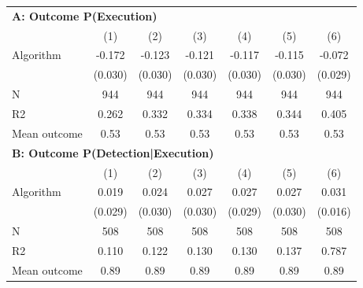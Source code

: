 \begin{tabular}{lcccccc} \toprule
\multicolumn{7}{l}{\textbf{A: Outcome P(Execution)}} \\ \multicolumn{1}{l}{} & (1) & (2) & (3) & (4) & (5) & (6) \\ \midrule
Algorithm   &      -0.172\sym{***}&      -0.123\sym{***}&      -0.121\sym{***}&      -0.117\sym{***}&      -0.115\sym{***}&      -0.072\sym{**} \\
            &     (0.030)         &     (0.030)         &     (0.030)         &     (0.030)         &     (0.030)         &     (0.029)         \\
\midrule
N           &         944         &         944         &         944         &         944         &         944         &         944         \\
R2          &       0.262         &       0.332         &       0.334         &       0.338         &       0.344         &       0.405         \\
Mean outcome&        0.53         &        0.53         &        0.53         &        0.53         &        0.53         &        0.53         \\

\midrule \multicolumn{7}{l}{\textbf{B: Outcome P(Detection|Execution)}} \\ \multicolumn{1}{l}{} & (1) & (2) & (3) & (4) & (5) & (6) \\ \midrule
Algorithm   &       0.019         &       0.024         &       0.027         &       0.027         &       0.027         &       0.031\sym{*}  \\
            &     (0.029)         &     (0.030)         &     (0.030)         &     (0.029)         &     (0.030)         &     (0.016)         \\
\midrule
N           &         508         &         508         &         508         &         508         &         508         &         508         \\
R2          &       0.110         &       0.122         &       0.130         &       0.130         &       0.137         &       0.787         \\
Mean outcome&        0.89         &        0.89         &        0.89         &        0.89         &        0.89         &        0.89         \\


\end{tabular}
